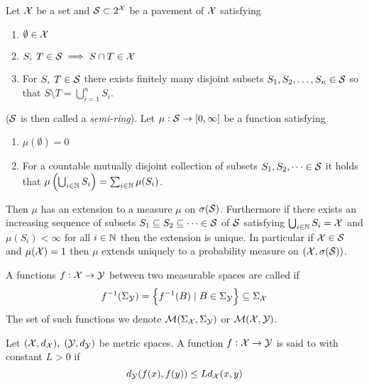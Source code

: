 \begin{thm}
  Let $\mathcal{X}$ be a set and $\mathcal{S} \subset 2^\mathcal{X}$ be a pavement of $\mathcal{X}$
  satisfying
  \begin{enumerate}
    \item $\emptyset \in \mathcal{X}$
    \item $S,\; T \in \mathcal{S} \implies S \cap T \in \mathcal{X}$
    \item For $S,\; T \in \mathcal{S}$ there exists finitely many disjoint
      subsets $S_1, S_2, \dots, S_n \in \mathcal{S}$ so that
      $ S \setminus T = \bigcup_{i=1}^n S_i$.
  \end{enumerate}
  ($\mathcal{S}$ is then called a \emph{semi-ring}).
  Let $\mu : \mathcal{S} \to [0,\infty]$ be a function satisfying
  \begin{enumerate}[label=\roman*.]
    \item $\mu(\emptyset) = 0$
    \item For a countable mutually disjoint collection of subsets
      $S_1, S_2, \dots \in \mathcal{S}$ it holds that
      $\mu\left( \bigcup_{i \in \mathbb{N}} S_i \right)
      = \sum_{i \in \mathbb{N}} \mu(S_i)$.
  \end{enumerate}
  Then $\mu$ has an extension to a measure $\mu$ on $\sigma(\mathcal{S})$.
  Furthermore if there exists an increasing sequence of subsets
  $S_1 \subseteq S_2 \subseteq \dots \in \mathcal{S}$ of $\mathcal{S}$
  satisfying $\bigcup_{i \in \mathbb{N}} S_i = \mathcal{X}$ and
  $\mu(S_i) < \infty$ for all $i \in \mathbb{N}$ then
  the extension is unique.
  In particular if $\mathcal{X} \in \mathcal{S}$ and $\mu(\mathcal{X})=1$ then
  $\mu$ extends uniquely to a probability measure on $(\mathcal{X}, \sigma(\mathcal{S}))$.
  \label{thm:caratheo}
\end{thm}

\begin{defn}
  A functions $f : \mathcal{X} \to \mathcal{Y}$ between two measurable spaces
  are called  if
  \[ f^{-1}(\Sigma_\mathcal{Y}) =
    \left\{ f^{-1}(B) \mid B \in \Sigma_\mathcal{Y} \right\}
  \subseteq \Sigma_\mathcal{X} \]
  The set of such functions we denote
  $\mathcal{M}(\Sigma_\mathcal{X}, \Sigma_\mathcal{Y})$ or $\mathcal{M}(\mathcal{X}, \mathcal{Y})$.
  \label{defn:measFunc}
\end{defn}

\begin{defn}
  Let $(\mathcal{X}, d_\mathcal{X}), \; (\mathcal{Y}, d_\mathcal{Y})$ be metric spaces.
  A function $f: \mathcal{X} \to \mathcal{Y}$ is
  said to  with constant $L > 0$ if
  \[ d_\mathcal{Y}(f(x),f(y)) \leq L d_\mathcal{X}(x,y) \]
  \label{defn:Lipschitz}
\end{defn}

